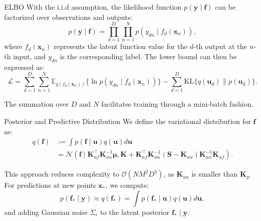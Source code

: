 \begin{frame}{ELBO}
	With the i.i.d assumption, the likelihood function $p(\mathbf{y} \mid \mathbf{f})$ can be factorized over observations and outputs:
	\begin{equation}
	p(\mathbf{y} \mid \mathbf{f}) = \prod_{d=1}^D\prod_{n=1}^N p(y_{dn} \mid f_{d}(\mathbf{x}_n)),
	\end{equation}
	where $f_{d}(\mathbf{x}_n)$ represents the latent function value for the $d$-th output at the $n$-th input, and $y_{dn}$ is the corresponding label. The lower bound can then be expressed as:
	\begin{equation}\label{eq:sogp_elbo}
	\mathcal{L} = \sum_{d=1}^D\sum_{n=1}^N \mathbb{E}_{q(f_{d}(\mathbf{x}_n))}\{\ln p(y_{dn} \mid f_{d}(\mathbf{x}_n))\} - \sum_{d=1}^D \text{KL}\{q(\mathbf{u}_d)\parallel p(\mathbf{u}_d)\}.
	\end{equation}
	
	The summation over $D$ and $N$ facilitates training through a mini-batch fashion.
\end{frame}

\begin{frame}{Posterior and Predictive Distribution}
	We define the variational distribution for $\mathbf{f}$ as:
	\begin{align}
	q(\mathbf{f}) &:= \int p(\mathbf{f} \mid \mathbf{u}) q(\mathbf{u}) d\mathbf{u} \nonumber \\
	&= \mathcal{N}\left(\mathbf{f} \mid \mathbf{K}_{uf}^\top \mathbf{K}_{uu}^{-1} \boldsymbol{\mu}, \mathbf{K} + \mathbf{K}_{uf}^\top \mathbf{K}_{uu}^{-1}(\mathbf{S} - \mathbf{K}_{uu})\mathbf{K}_{uu}^{-1}\mathbf{K}_{uf} \right).
	\end{align}
	
	This approach reduces complexity to $\mathcal{O}(NM^2D^3)$, as $\mathbf{K}_{uu}$ is smaller than $\mathbf{K}_{y}$. For predictions at new points $\mathbf{x}_*$, we compute:
	\begin{equation}
	p(\mathbf{f}_* \mid \mathbf{y}) \approx q(\mathbf{f}_*) = \int p(\mathbf{f}_* \mid \mathbf{u}) q(\mathbf{u}) d \mathbf{u},
	\end{equation}
	and adding Gaussian noise $\Sigma_\epsilon$ to the latent posterior $\mathbf{f}_* \mid \mathbf{y}$.
\end{frame}

